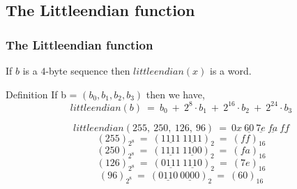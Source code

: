 \subsection{The Littleendian function}

\begin{frame}
\frametitle{The Littleendian function}

If $b$ is a $4$-byte sequence then $littleendian(x)$ is a word.
\begin{block}{Definition}
If b = $(b_0,b_1,b_2,b_3)$ then we have, $${littleendian(b)} \ = \ b_0 \ + \ 2^8 \cdot b_1 \ + \ 2^{16} \cdot b_2 \ + \ 2^{24} \cdot b_3$$
\end{block}
\begin{example}
$$littleendian(255, \ 250, \ 126, \ 96) \ = \ 0x \ \underline{60} \ \underline{7e} \ \underline{fa} \ \underline{ff}$$
$$(255)_{2^{8}} \ = \ (\underline{1111} \ \underline{1111})_2 \ = \ (ff)_{16}$$
$$(250)_{2^{8}} \ = \ (\underline{1111} \ \underline{1100})_2 \ = \ (fa)_{16}$$
$$(126)_{2^{8}} \ = \ (\underline{0111} \ \underline{1110})_2 \ = \ (7e)_{16}$$
$$(96)_{2^{8}} \ = \ (\underline{0110} \ \underline{0000})_2 \ = \ (60)_{16}$$
\end{example}
\end{frame}